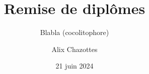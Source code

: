 \documentclass{beamer}
\title[Remise de diplômes]{Remise de diplômes}
\subtitle{Blabla (cocolitophore)}
\author{Alix Chazottes}
\institute{CentraleSupélec}
\date{21 juin 2024}
\begin{document}
\begin{frame}
  \titlepage
\end{frame}


\end{document}
